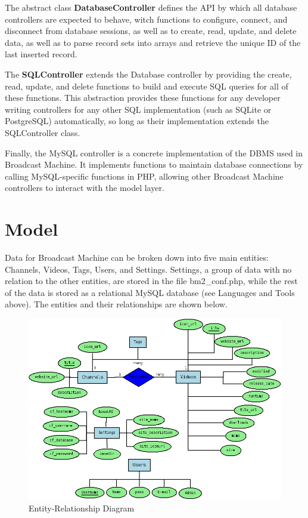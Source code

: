 \documentclass[a4paper,12pt]{report}
\begin{document}
The abstract class \textbf{DatabaseController} defines the API by which all database controllers are expected to behave, witch functions to configure, connect, and disconnect from database sessions, as well as to create, read, update, and delete data, as well as to parse record sets into arrays and retrieve the unique ID of the last inserted record.

The \textbf{SQLController} extends the Database controller by providing the create, read, update, and delete functions to build and execute SQL queries for all of these functions. This abstraction provides these functions for any developer writing controllers for any other SQL implementation (such as SQLite or PostgreSQL) automatically, so long as their implementation extends the SQLController class.

Finally, the MySQL controller is a concrete implementation of the DBMS used in Broadcast Machine. It implements functions to maintain database connections by calling MySQL-specific functions in PHP, allowing other Broadcast Machine controllers to interact with the model layer.

\section{Model}
Data for Broadcast Machine can be broken down into five main entities: Channels, Videos, Tags, Users, and Settings. Settings, a group of data with no relation to the other entities, are stored in the file bm2\_conf.php, while the rest of the data is stored as a relational MySQL database (see Languages and Tools above). The entities and their relationships are shown below.
\begin{figure}[h]
\begin{center}
\includegraphics[scale=0.45]{./images/er.png}
\end{center}
\caption{Entity-Relationship Diagram}
\end{figure}
\end{document}
